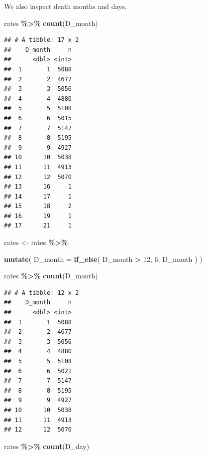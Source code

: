 \documentclass[
  11pt,
  oneside]{book}
\newenvironment{Shaded}{\begin{snugshade}}{\end{snugshade}}
\newcommand{\AttributeTok}[1]{\textcolor[rgb]{0.13,0.29,0.53}{#1}}
\newcommand{\DecValTok}[1]{\textcolor[rgb]{0.00,0.00,0.81}{#1}}
\newcommand{\FunctionTok}[1]{\textcolor[rgb]{0.13,0.29,0.53}{\textbf{#1}}}
\newcommand{\NormalTok}[1]{#1}
\newcommand{\OtherTok}[1]{\textcolor[rgb]{0.56,0.35,0.01}{#1}}
\newcommand{\SpecialCharTok}[1]{\textcolor[rgb]{0.81,0.36,0.00}{\textbf{#1}}}
\begin{document}
We also inspect death months and days.

\begin{Shaded}
\begin{Highlighting}[]
\NormalTok{rates }\SpecialCharTok{\%\textgreater{}\%}
  \FunctionTok{count}\NormalTok{(D\_month)}
\end{Highlighting}
\end{Shaded}

\begin{verbatim}
## # A tibble: 17 x 2
##    D_month     n
##      <dbl> <int>
##  1       1  5088
##  2       2  4677
##  3       3  5056
##  4       4  4880
##  5       5  5108
##  6       6  5015
##  7       7  5147
##  8       8  5195
##  9       9  4927
## 10      10  5038
## 11      11  4913
## 12      12  5070
## 13      16     1
## 14      17     1
## 15      18     2
## 16      19     1
## 17      21     1
\end{verbatim}

\begin{Shaded}
\begin{Highlighting}[]
\NormalTok{rates }\OtherTok{\textless{}{-}}\NormalTok{ rates }\SpecialCharTok{\%\textgreater{}\%}
  
  \FunctionTok{mutate}\NormalTok{(}
    \AttributeTok{D\_month =} \FunctionTok{if\_else}\NormalTok{(}
\NormalTok{      D\_month }\SpecialCharTok{\textgreater{}} \DecValTok{12}\NormalTok{,}
      \DecValTok{6}\NormalTok{,}
\NormalTok{      D\_month}
\NormalTok{    )}
\NormalTok{  )}

\NormalTok{rates }\SpecialCharTok{\%\textgreater{}\%}
  \FunctionTok{count}\NormalTok{(D\_month)}
\end{Highlighting}
\end{Shaded}

\begin{verbatim}
## # A tibble: 12 x 2
##    D_month     n
##      <dbl> <int>
##  1       1  5088
##  2       2  4677
##  3       3  5056
##  4       4  4880
##  5       5  5108
##  6       6  5021
##  7       7  5147
##  8       8  5195
##  9       9  4927
## 10      10  5038
## 11      11  4913
## 12      12  5070
\end{verbatim}

\begin{Shaded}
\begin{Highlighting}[]
\NormalTok{rates }\SpecialCharTok{\%\textgreater{}\%}
  \FunctionTok{count}\NormalTok{(D\_day)}
\end{Highlighting}
\end{Shaded}
\end{document}
